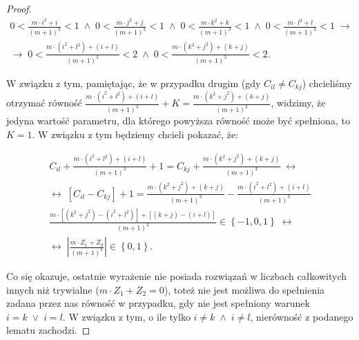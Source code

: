 \begin{proof}
	\begin{gather}
		0 < \frac{m \cdot i^{2} + i}{\left( m + 1 \right)^{3}} < 1 \; \wedge \; 0 < \frac{m \cdot j^{2} + j}{\left( m + 1 \right)^{3}} < 1 \; \wedge \; 0 < \frac{m \cdot k^{2} + k}{\left( m + 1 \right)^{3}} < 1 \; \wedge \; 0 < \frac{m \cdot l^{2} + l}{\left( m + 1 \right)^{3}} < 1 \; \rightarrow \\
		\rightarrow \; 0 < \frac{m \cdot \left( i^{2} + l^{2} \right) + \left( i + l \right)}{\left( m + 1 \right)^{3}} < 2 \; \wedge \; 0 < \frac{m \cdot \left( k^{2} + j^{2} \right) + \left( k + j \right)}{\left( m + 1 \right)^{3}} < 2\text{.}
	\end{gather}
	
	W związku z tym, pamiętając, że w przypadku drugim (gdy $C_{il} \neq C_{kj}$) chcieliśmy otrzymać równość $\frac{m \cdot \left( i^{2} + l^{2} \right) + \left( i + l \right)}{\left( m + 1 \right)^{3}} + K = \frac{m \cdot \left( k^{2} + j^{2} \right) + \left( k + j \right)}{\left( m + 1 \right)^{3}}$, widzimy, że jedyna wartość parametru, dla którego powyższa równość może być spełniona, to $K = 1$. W związku z tym będziemy chcieli pokazać, że:
	
	\begin{gather}
		C_{il} + \frac{m \cdot \left( i^{2} + l^{2} \right) + \left( i + l \right)}{\left( m + 1 \right)^{3}} + 1 = C_{kj} + \frac{m \cdot \left( k^{2} + j^{2} \right) + \left( k + j \right)}{\left( m + 1 \right)^{3}} \; \leftrightarrow \\
		\leftrightarrow \; \left[ C_{il} - C_{kj} \right] + 1 = \frac{m \cdot \left( k^{2} + j^{2} \right) + \left( k + j \right)}{\left( m + 1 \right)^{3}} - \frac{m \cdot \left( i^{2} + l^{2} \right) + \left( i + l \right)}{\left( m + 1 \right)^{3}} \\
		\frac{m \cdot \left[ \left( k^{2} + j^{2} \right) - \left( i^{2} + l^{2} \right) \right] + \left[ \left( k + j \right) - \left( i + l \right) \right]}{\left( m + 1 \right)^{3}} \in \left\{ -1, 0, 1 \right\} \; \leftrightarrow \\
		\leftrightarrow \; \left| \frac{m \cdot Z_{1} + Z_{2}}{\left( m + 1 \right)^{3}} \right| \in \left\{ 0, 1 \right\}\text{.}
	\end{gather}
	
	Co się okazuje, ostatnie wyrażenie nie posiada rozwiązań w liczbach całkowitych innych niż trywialne ($m \cdot Z_{1} + Z_{2} = 0$), toteż nie jest możliwa do spełnienia zadana przez nas równość w przypadku, gdy nie jest spełniony warunek $i = k \; \vee \; i = l$. W związku z tym, o ile tylko $i \neq k \; \wedge \; i \neq l$, nierówność z podanego lematu zachodzi.
\end{proof}

